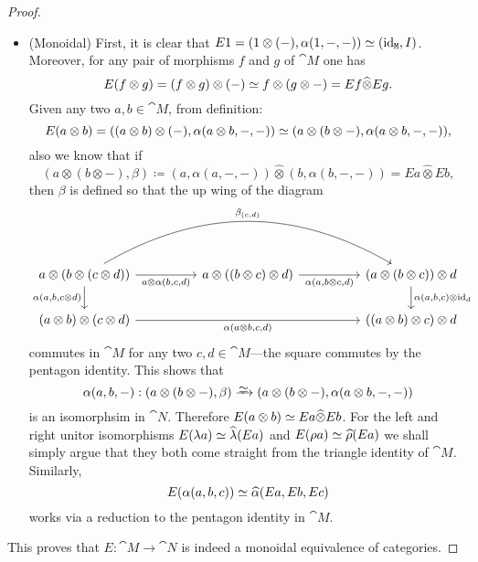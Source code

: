 \documentclass[../../deep-dive]{subfiles}
\begin{document}
\begin{proof}
\begin{itemize}
        \item (Monoidal) First, it is clear that
              \(E 1 = (1 \otimes (-), \alpha(1, -, -)) \simeq (\operatorname{id}_{\texttt M}, I)\). Moreover,
              for any pair of morphisms \(f\) and \(g\) of \(\cat M\) one has
              \[
                  E(f \otimes g) = (f \otimes g) \otimes (-)
                  \simeq f \otimes (g \otimes -)
                  = E f \widehat\otimes E g.
              \]
              Given any two \(a, b \in \cat M\), from definition:
              \[
                  E (a \otimes b) = ((a \otimes b) \otimes (-), \alpha(a \otimes b, -, -))
                  \simeq (a \otimes (b \otimes -), \alpha(a \otimes b, -, -)),
              \]
              also we know that if
              \[
                  (a \otimes (b \otimes -), \beta)
                  \coloneq (a, \alpha(a, -, -)) \widehat\otimes (b, \alpha(b, -, -))
                  = E a \widehat\otimes E b,
              \]
              then \(\beta\) is defined so that the up wing of the diagram
              \[
                  \begin{tikzcd}
                      a \otimes (b \otimes (c \otimes d))
                      \ar[rr, "{a \otimes \alpha(b, c, d)}"']
                      \ar[rrrr, bend left, "\beta_{(c, d)}"]
                      \ar[d, "\alpha{(a, b, c \otimes d)}"']
                      &&a \otimes ((b \otimes c) \otimes d)
                      \ar[rr, "{\alpha(a, b \otimes c, d)}"']
                      &&(a \otimes (b \otimes c)) \otimes d
                      \ar[d, "\alpha{(a, b, c)} \otimes \Id_d"]
                      \\
                      (a \otimes b) \otimes (c \otimes d)
                      \ar[rrrr, "\alpha{(a \otimes b, c, d)}"']
                      && &&((a \otimes b) \otimes c) \otimes d
                  \end{tikzcd}
              \]
              commutes in \(\cat M\) for any two \(c, d \in \cat M\)---the square commutes
              by the pentagon identity. This shows that
              \[
                  \alpha(a, b, -): (a \otimes (b \otimes -), \beta)
                  \isoto (a \otimes (b \otimes -), \alpha(a \otimes b, -, -))
              \]
              is an isomorphsim in \(\cat N\). Therefore
              \(E(a \otimes b) \simeq E a \widehat \otimes E b\). For the left and right
              unitor isomorphisms \(E (\lambda a) \simeq \widehat \lambda(E a)\) and
              \(E(\rho a) \simeq \widehat \rho(E a)\) we shall simply argue that they both
              come straight from the triangle identity of \(\cat M\). Similarly,
              \[
                  E(\alpha(a, b, c)) \simeq \widehat \alpha(E a, E b, E c)
              \]
              works via a reduction to the pentagon identity in \(\cat M\).
    \end{itemize}
    This proves that \(E: \cat M \to \cat N\) is indeed a monoidal equivalence of
    categories.
\end{proof}
\end{document}
